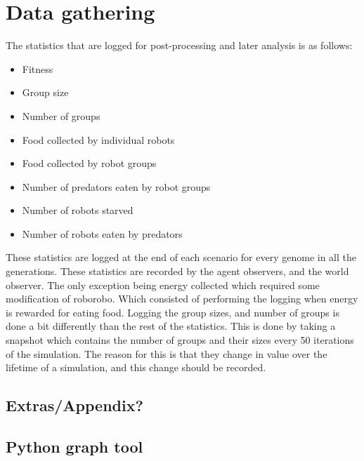 \clearpage
\section{Data gathering}
The statistics that are logged for post-processing and later analysis is as follows:
\begin{itemize}
	\item Fitness
	\item Group size
	\item Number of groups
	\item Food collected by individual robots
	\item Food collected by robot groups
	\item Number of predators eaten by robot groups
	\item Number of robots starved
	\item Number of robots eaten by predators
\end{itemize}
These statistics are logged at the end of each scenario for every genome in all the generations.
These statistics are recorded by the agent observers, and the world observer. 
The only exception being energy collected which required some modification of roborobo.
Which consisted of performing the logging when energy is rewarded for eating food.
Logging the group sizes, and number of groups is done a bit differently than the rest of the statistics.
This is done by taking a snapshot which contains the number of groups and their sizes every 50 iterations of the simulation.
The reason for this is that they change in value over the lifetime of a simulation, and this change should be recorded.



\clearpage
\subsection{Extras/Appendix?}
	\subsection{Python graph tool}
\clearpage
	